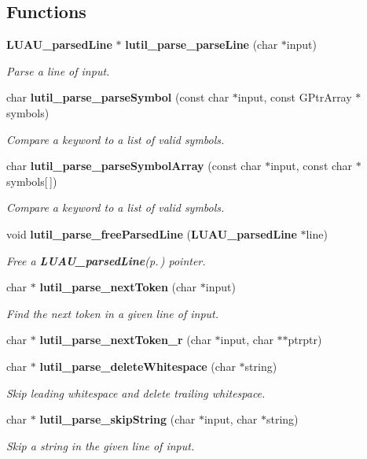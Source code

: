 \subsection*{Functions}
\begin{CompactItemize}
\item 
{\bf LUAU\_\-parsed\-Line} $\ast$ {\bf lutil\_\-parse\_\-parse\-Line} (char $\ast$input)
\begin{CompactList}\small\item\em Parse a line of input. \item\end{CompactList}\item 
char {\bf lutil\_\-parse\_\-parse\-Symbol} (const char $\ast$input, const GPtr\-Array $\ast$symbols)
\begin{CompactList}\small\item\em Compare a keyword to a list of valid symbols. \item\end{CompactList}\item 
char {\bf lutil\_\-parse\_\-parse\-Symbol\-Array} (const char $\ast$input, const char $\ast$symbols[$\,$])
\begin{CompactList}\small\item\em Compare a keyword to a list of valid symbols. \item\end{CompactList}\item 
void {\bf lutil\_\-parse\_\-free\-Parsed\-Line} ({\bf LUAU\_\-parsed\-Line} $\ast$line)
\begin{CompactList}\small\item\em Free a {\bf LUAU\_\-parsed\-Line}{\rm (p.\,\pageref{structLUAU__parsedLine})} pointer. \item\end{CompactList}\item 
char $\ast$ {\bf lutil\_\-parse\_\-next\-Token} (char $\ast$input)
\begin{CompactList}\small\item\em Find the next token in a given line of input. \item\end{CompactList}\item 
char $\ast$ {\bf lutil\_\-parse\_\-next\-Token\_\-r} (char $\ast$input, char $\ast$$\ast$ptrptr)
\item 
char $\ast$ {\bf lutil\_\-parse\_\-delete\-Whitespace} (char $\ast$string)
\begin{CompactList}\small\item\em Skip leading whitespace and delete trailing whitespace. \item\end{CompactList}\item 
char $\ast$ {\bf lutil\_\-parse\_\-skip\-String} (char $\ast$input, char $\ast$string)
\begin{CompactList}\small\item\em Skip a string in the given line of input. \item\end{CompactList}\end{CompactItemize}


